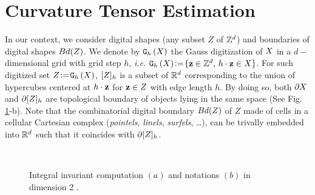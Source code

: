 \documentclass{llncs}
\begin{document}
\section{Curvature Tensor Estimation}
\label{sec:curv-tens-estim}

\sloppy In our context, we consider digital shapes (any subset $Z$ of ${\mathbb{Z}}^d$)
and boundaries of digital shapes $Bd(Z)$. We denote by $\mathtt{G}_{h}\left(X\right)$ the
Gauss digitization of $X$ in a $d-$dimensional grid with grid step $h$,
\emph{i.e.}  $\mathtt{G}_{h}\left(X\right) \!\mathrel{\mathop:}=\! \{ \mathbf{z} \in {\mathbb{Z}}^d,\, h\cdot\mathbf{z}\in X\}$. For such
digitized set $Z\!\mathrel{\mathop:}=\!\mathtt{G}_{h}\left(X\right)$, $\lbrack Z \rbrack_{h}$ is a subset of ${\mathbb{R}}^d$
corresponding to the union of hypercubes centered at $h\cdot \mathbf{z}$ for $\mathbf{z}\in Z$
with edge length $h$. By doing so, both $\partial X$ and
$\partial\lbrack Z \rbrack_{h}$ are topological boundary of objects lying in the same
space (See Fig. \ref{fig:notations}-b). Note that the combinatorial digital
boundary $Bd(Z)$ of $Z$ made of cells in a cellular Cartesian complex
(\emph{pointels}, \emph{linels}, \emph{surfels}, \ldots), can be trivally
embedded into ${\mathbb{R}}^d$ such that it coincides with $\partial\lbrack Z \rbrack_{h}$.


\begin{figure}[t]{\small
    \begin{center}
      ~~~~~~
      \vspace{-0.4cm}
    \end{center}}
    \caption{Integral invariant computation $(a)$ and
      notations $(b)$ in dimension 2 \cite{CVIU2014}.\label{fig:notations}}
\end{figure}
 
\end{document}
